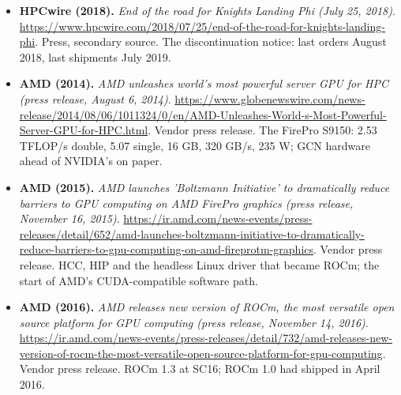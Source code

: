 \documentclass[11pt,letterpaper]{article}
\begin{document}
\begin{itemize}[leftmargin=1.2em,itemsep=3pt]
\item \textbf{HPCwire (2018).} \textit{End of the road for Knights Landing Phi (July 25, 2018)}. \url{https://www.hpcwire.com/2018/07/25/end-of-the-road-for-knights-landing-phi}. Press, secondary source. The discontinuation notice: last orders August 2018, last shipments July 2019.
\item \textbf{AMD (2014).} \textit{AMD unleashes world's most powerful server GPU for HPC (press release, August 6, 2014)}. \url{https://www.globenewswire.com/news-release/2014/08/06/1011324/0/en/AMD-Unleashes-World-s-Most-Powerful-Server-GPU-for-HPC.html}. Vendor press release. The FirePro S9150: 2.53 TFLOP/s double, 5.07 single, 16 GB, 320 GB/s, 235 W; GCN hardware ahead of NVIDIA's on paper.
\item \textbf{AMD (2015).} \textit{AMD launches 'Boltzmann Initiative' to dramatically reduce barriers to GPU computing on AMD FirePro graphics (press release, November 16, 2015)}. \url{https://ir.amd.com/news-events/press-releases/detail/652/amd-launches-boltzmann-initiative-to-dramatically-reduce-barriers-to-gpu-computing-on-amd-fireprotm-graphics}. Vendor press release. HCC, HIP and the headless Linux driver that became ROCm; the start of AMD's CUDA-compatible software path.
\item \textbf{AMD (2016).} \textit{AMD releases new version of ROCm, the most versatile open source platform for GPU computing (press release, November 14, 2016)}. \url{https://ir.amd.com/news-events/press-releases/detail/732/amd-releases-new-version-of-rocm-the-most-versatile-open-source-platform-for-gpu-computing}. Vendor press release. ROCm 1.3 at SC16; ROCm 1.0 had shipped in April 2016.
\end{itemize}
\end{document}
